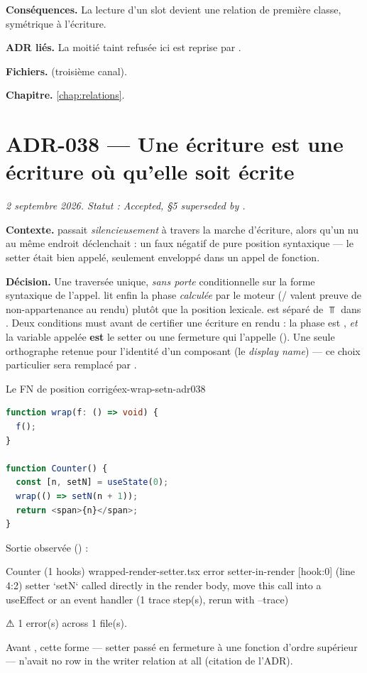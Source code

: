 \textbf{Conséquences.} La lecture d'un slot devient une relation de première
classe, symétrique à l'écriture.

\textbf{ADR liés.} La moitié \og taint\fg{} refusée ici est reprise par
.

\textbf{Fichiers.}  (troisième canal).

\textbf{Chapitre.} \cref{chap:relations}.

\section{ADR-038 --- Une écriture est une écriture où qu'elle soit écrite}
\label{adr:38}
\noindent\textit{2 septembre 2026. Statut : Accepted, §5 superseded by .}

\textbf{Contexte.}  passait \emph{silencieusement} à
travers la marche d'écriture, alors qu'un  nu au même endroit
déclenchait \Error{}  : un faux négatif de pure
position syntaxique --- le setter était bien appelé, seulement enveloppé dans
un appel de fonction.

\textbf{Décision.} Une traversée unique, \emph{sans porte} conditionnelle sur
la forme syntaxique de l'appel.  lit enfin la phase
\emph{calculée} par le moteur (/ valent preuve de
non-appartenance au rendu) plutôt que la position lexicale. 
est séparé de $\Top$ dans . Deux conditions must
avant de certifier une écriture en rendu : la phase est , \emph{et}
la variable appelée \textbf{est} le setter ou une fermeture qui l'appelle
(). Une seule orthographe retenue pour l'identité d'un
composant (le \emph{display name}) --- ce choix particulier sera remplacé par
.

\begin{exemple}{Le FN de position corrigé}{ex-wrap-setn-adr038}
\begin{lstlisting}[language=TypeScript,caption={Setter enveloppé, appelé en rendu}]
function wrap(f: () => void) {
  f();
}

function Counter() {
  const [n, setN] = useState(0);
  wrap(() => setN(n + 1));
  return <span>{n}</span>;
}
\end{lstlisting}
Sortie observée (\code{\snapshotCommit}) :
\begin{sortie}
  Counter  (1 hooks)  wrapped-render-setter.tsx
    error  setter-in-render  [hook:0]  (line 4:2)  setter `setN` called directly in the render body, move this call into a useEffect or an event handler
       (1 trace step(s), rerun with --trace)

⚠  1 error(s) across 1 file(s).
\end{sortie}
Avant , cette forme --- setter passé en fermeture à une fonction
d'ordre supérieur --- n'avait \og no row in the writer relation at all\fg{}
(citation de l'ADR).
\end{exemple}

